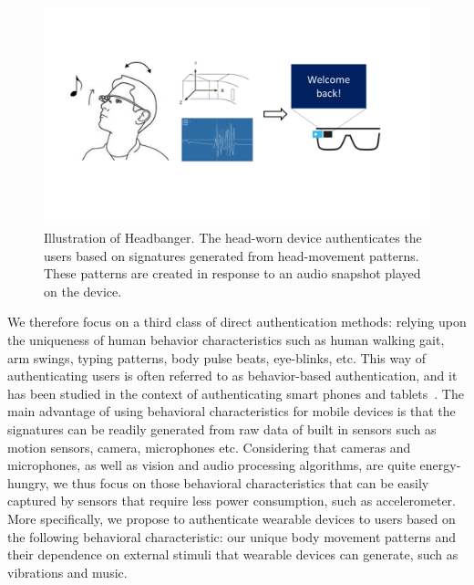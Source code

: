 \begin{figure}[t!]
\centering
\includegraphics[width=\columnwidth]{figure/headbanger_illustrate.png}
\caption{Illustration of Headbanger. The head-worn device authenticates the
users based on signatures generated from head-movement patterns.  These patterns are created in
response to an audio snapshot played on the device.}
\label{fig:headbanger-illustrate}
\end{figure}

We therefore focus on a third class of direct authentication methods: relying upon the uniqueness of human behavior characteristics such as human walking gait, arm swings, typing patterns, body pulse beats, eye-blinks, etc. This way of authenticating users is often referred to as behavior-based authentication, and it has been studied in the context of authenticating smart phones and tablets~\cite{rahman2014bodybeat,cornelius2014wearable,stevenage1999visual,okumura2006study,monrose2000keystroke,jorgensen2011mouse,bo2013silentsense,de2012touch}. The main advantage of using behavioral characteristics for mobile devices is that the signatures can be readily generated from raw data of built in sensors such as motion sensors, camera, microphones etc. Considering that cameras and microphones, as well as vision and audio processing algorithms, are quite energy-hungry, we thus focus on those behavioral characteristics that can be easily captured by sensors that require less power consumption, such as accelerometer. More specifically, we propose to authenticate wearable devices to users based on the following behavioral characteristic: our unique body movement patterns and their dependence on external stimuli that wearable devices can generate, such as vibrations and music.

